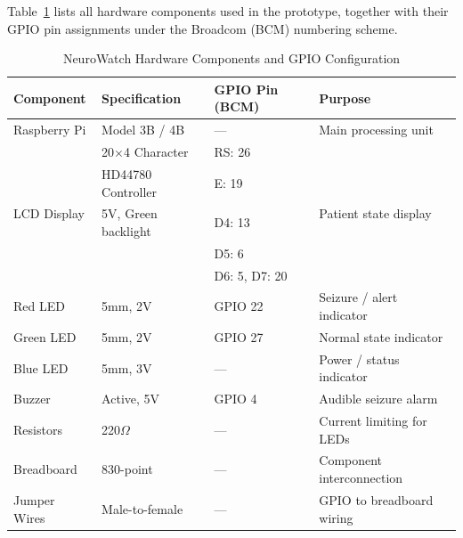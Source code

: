 \documentclass[12pt, a4paper]{report}
\begin{document}
Table~\ref{tab:hardware} lists all hardware components used in the prototype,
together with their GPIO pin assignments under the Broadcom (BCM) numbering scheme.

\begin{table}[H]
    \centering
    \caption{NeuroWatch Hardware Components and GPIO Configuration}
    \label{tab:hardware}
    \begin{tabular}{llll}
        \toprule
        \textbf{Component} & \textbf{Specification} & \textbf{GPIO Pin (BCM)} & \textbf{Purpose} \\
        \midrule
        Raspberry Pi        & Model 3B / 4B           & ---          & Main processing unit \\
        \midrule
        \multirow{5}{*}{LCD Display}
                            & 20$\times$4 Character   & RS: 26       & \multirow{5}{*}{Patient state display} \\
                            & HD44780 Controller      & E:  19       & \\
                            & 5V, Green backlight     & D4: 13       & \\
                            &                         & D5: 6        & \\
                            &                         & D6: 5, D7: 20& \\
        \midrule
        Red LED             & 5mm, 2V                 & GPIO 22      & Seizure / alert indicator \\
        Green LED           & 5mm, 2V                 & GPIO 27      & Normal state indicator \\
        Blue LED            & 5mm, 3V                 & ---          & Power / status indicator \\
        \midrule
        Buzzer              & Active, 5V              & GPIO 4       & Audible seizure alarm \\
        \midrule
        Resistors           & 220$\Omega$             & ---          & Current limiting for LEDs \\
        Breadboard          & 830-point               & ---          & Component interconnection \\
        Jumper Wires        & Male-to-female          & ---          & GPIO to breadboard wiring \\
        \bottomrule
    \end{tabular}
\end{table}
\end{document}
